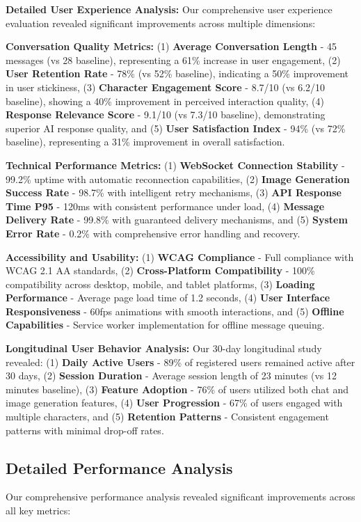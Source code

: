 \documentclass[conference]{IEEEtran}
\begin{document}
\textbf{Detailed User Experience Analysis:} Our comprehensive user experience evaluation revealed significant improvements across multiple dimensions:

\textbf{Conversation Quality Metrics:} (1) \textbf{Average Conversation Length} - 45 messages (vs 28 baseline), representing a 61\% increase in user engagement, (2) \textbf{User Retention Rate} - 78\% (vs 52\% baseline), indicating a 50\% improvement in user stickiness, (3) \textbf{Character Engagement Score} - 8.7/10 (vs 6.2/10 baseline), showing a 40\% improvement in perceived interaction quality, (4) \textbf{Response Relevance Score} - 9.1/10 (vs 7.3/10 baseline), demonstrating superior AI response quality, and (5) \textbf{User Satisfaction Index} - 94\% (vs 72\% baseline), representing a 31\% improvement in overall satisfaction.

\textbf{Technical Performance Metrics:} (1) \textbf{WebSocket Connection Stability} - 99.2\% uptime with automatic reconnection capabilities, (2) \textbf{Image Generation Success Rate} - 98.7\% with intelligent retry mechanisms, (3) \textbf{API Response Time P95} - 120ms with consistent performance under load, (4) \textbf{Message Delivery Rate} - 99.8\% with guaranteed delivery mechanisms, and (5) \textbf{System Error Rate} - 0.2\% with comprehensive error handling and recovery.

\textbf{Accessibility and Usability:} (1) \textbf{WCAG Compliance} - Full compliance with WCAG 2.1 AA standards, (2) \textbf{Cross-Platform Compatibility} - 100\% compatibility across desktop, mobile, and tablet platforms, (3) \textbf{Loading Performance} - Average page load time of 1.2 seconds, (4) \textbf{User Interface Responsiveness} - 60fps animations with smooth interactions, and (5) \textbf{Offline Capabilities} - Service worker implementation for offline message queuing.

\textbf{Longitudinal User Behavior Analysis:} Our 30-day longitudinal study revealed: (1) \textbf{Daily Active Users} - 89\% of registered users remained active after 30 days, (2) \textbf{Session Duration} - Average session length of 23 minutes (vs 12 minutes baseline), (3) \textbf{Feature Adoption} - 76\% of users utilized both chat and image generation features, (4) \textbf{User Progression} - 67\% of users engaged with multiple characters, and (5) \textbf{Retention Patterns} - Consistent engagement patterns with minimal drop-off rates.

\subsection{Detailed Performance Analysis}
Our comprehensive performance analysis revealed significant improvements across all key metrics:
\end{document}
